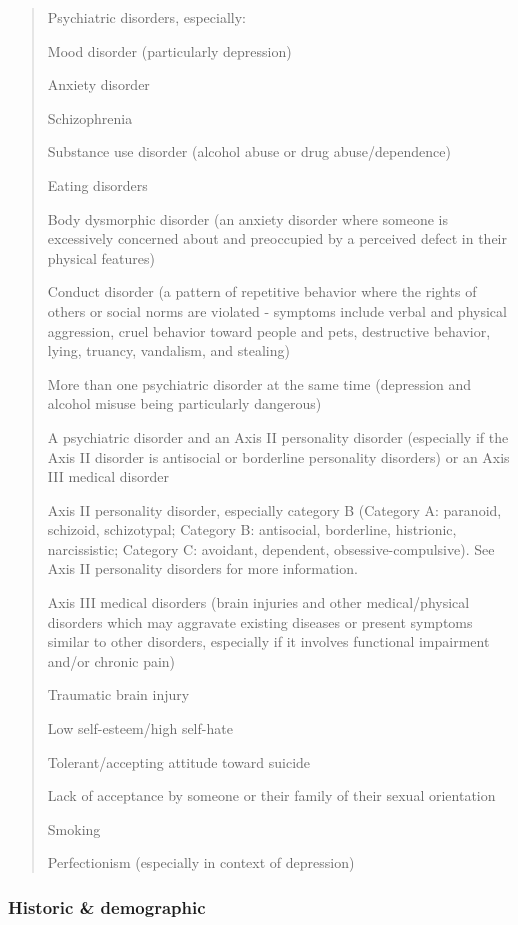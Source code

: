 \documentclass[12pt]{article}
\begin{document}
\begin{verse}

Psychiatric disorders, especially:

Mood disorder (particularly depression)

Anxiety disorder

Schizophrenia

Substance use disorder (alcohol abuse or drug abuse/dependence)

Eating disorders

Body dysmorphic disorder (an anxiety disorder where someone is excessively concerned about and preoccupied by a perceived defect in their physical features)

Conduct disorder (a pattern of repetitive behavior where the rights of others or social norms are violated - symptoms include verbal and physical aggression, cruel behavior toward people and pets, destructive behavior, lying, truancy, vandalism, and stealing)

More than one psychiatric disorder at the same time (depression and alcohol misuse being particularly dangerous)

A psychiatric disorder and an Axis II personality disorder (especially if the Axis II disorder is antisocial or borderline personality disorders) or an Axis III medical disorder

Axis II personality disorder, especially category B (Category A: paranoid, schizoid, schizotypal; Category B: antisocial, borderline, histrionic, narcissistic; Category C: avoidant, dependent, obsessive-compulsive). See Axis II personality disorders for more information.

Axis III medical disorders (brain injuries and other medical/physical disorders which may aggravate existing diseases or present symptoms similar to other disorders, especially if it involves functional impairment and/or chronic pain)

Traumatic brain injury

Low self-esteem/high self-hate

Tolerant/accepting attitude toward suicide

Lack of acceptance by someone or their family of their sexual orientation

Smoking

Perfectionism (especially in context of depression)

\end{verse}

\subsubsection{Historic \& demographic}
\end{document}
